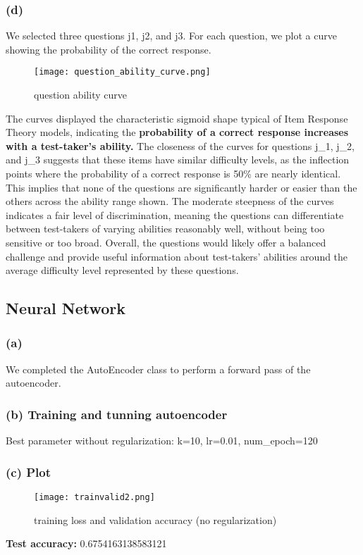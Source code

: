 \documentclass{article}
\begin{document}
\subsubsection*{(d)}
We selected three questions j1, j2, and j3. For each question, we plot a curve showing the probability of the correct response.
\begin{figure}[H]
    \centering
    \texttt{[image: question\_ability\_curve.png]}
    \caption{question ability curve}
    \label{fig:enter-label}
\end{figure}
The curves displayed the characteristic sigmoid shape typical of Item Response Theory models, indicating the \textbf{probability of a correct response increases with a test-taker's ability.} The closeness of the curves for questions j\_1, j\_2, and j\_3 suggests that these items have similar difficulty levels, as the inflection points where the probability of a correct response is 50\% are nearly identical. This implies that none of the questions are significantly harder or easier than the others across the ability range shown. The moderate steepness of the curves indicates a fair level of discrimination, meaning the questions can differentiate between test-takers of varying abilities reasonably well, without being too sensitive or too broad. Overall, the questions would likely offer a balanced challenge and provide useful information about test-takers' abilities around the average difficulty level represented by these questions.




\subsection*{Neural Network}
\subsubsection*{(a)}
We completed the AutoEncoder class to perform a forward pass of the autoencoder.

\subsubsection*{(b) Training and tunning autoencoder}
Best parameter without regularization: k=10, lr=0.01, num\_epoch=120



\subsubsection*{(c) Plot}
\begin{figure}[H]
    \centering
    \texttt{[image: trainvalid2.png]}
    \caption{training loss and validation accuracy (no regularization)}
    \label{fig:enter-label}
\end{figure}
\textbf{Test accuracy:}  0.6754163138583121
\end{document}
